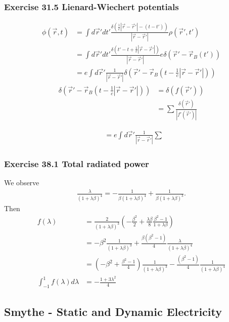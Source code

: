 \documentclass[10pt,a4paper]{book}
\theoremstyle{definition}
\begin{document}
\subsubsection{Exercise 31.5 Lienard-Wiechert potentials}
\begin{align}
\phi(\vec{r},t)&=\int d\vec{r}'dt'\frac{\delta(\frac{1}{c}|\vec{r}-\vec{r}'|-(t-t'))}{|\vec{r}-\vec{r}'|}\rho(\vec{r}',t')\\
&=\int d\vec{r}'dt'\frac{\delta(t'-t+\frac{1}{c}|\vec{r}-\vec{r}'|)}{|\vec{r}-\vec{r}'|}e\delta(\vec{r}'-\vec{r}_B(t'))\\
&=e\int d\vec{r}'\frac{1}{|\vec{r}-\vec{r}'|}\delta(\vec{r}'-\vec{r}_B(t-\frac{1}{c}|\vec{r}-\vec{r}'|))
\end{align}
\begin{align}
\delta(\vec{r}'-\vec{r}_B(t-\frac{1}{c}|\vec{r}-\vec{r}'|))&=\delta(f(\vec{r}'))\\
&=\sum\frac{\delta(\vec{r}')}{|f'(\vec{r}')|}
\end{align}

\begin{align}
&=e\int d\vec{r}'\frac{1}{|\vec{r}-\vec{r}'|}\sum\frac{}{}
\end{align}


\subsubsection{Exercise 38.1 Total radiated power}
We observe
\begin{align}
\frac{\lambda}{(1+\lambda\beta)^4}=-\frac{1}{\beta(1+\lambda\beta)^4}+\frac{1}{\beta(1+\lambda\beta)^3}.    
\end{align}
Then
\begin{align}
    f(\lambda)&=\frac{2}{(1+\lambda\beta)^3}\left(-\frac{\beta^2}{2}+\frac{\lambda\beta}{8}\frac{\beta^2-1}{1+\lambda\beta}\right)\\
    &=-\beta^2\frac{1}{(1+\lambda\beta)^3}+\frac{\beta(\beta^2-1)}{4}\frac{\lambda}{(1+\lambda\beta)^4}\\
    &=\left(-\beta^2+\frac{\beta^2-1}{4}\right)\frac{1}{(1+\lambda\beta)^3}-\frac{(\beta^2-1)}{4}\frac{1}{(1+\lambda\beta)^4}\\
    \int_{-1}^1f(\lambda)d\lambda&=-\frac{1+3\lambda^2}{4}
\end{align}


\subsection{{\sc Smythe} - Static and Dynamic Electricity}
\end{document}
